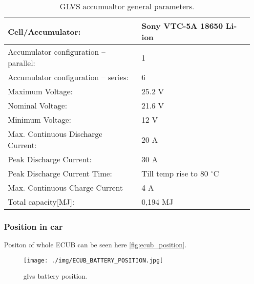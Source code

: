 \begin{table}[H]
	\centering
	\caption{GLVS accumualtor general parameters.}
	\begin{tabu}{|X|X|}\hline
		Cell/Accumulator: & Sony VTC-5A 18650 Li-ion\\\hline
		Accumulator configuration – parallel: & 1 \\\hline
		Accumulator configuration – series: & 6 \\\hline
		Maximum Voltage: & 25.2 V \\\hline
		Nominal Voltage: & 21.6 V \\\hline
		Minimum Voltage: & 12 V \\\hline
		Max. Continuous Discharge Current: & 20 A \\\hline
		Peak Discharge Current: & 30 A \\\hline
		Peak Discharge Current Time: & Till temp rise to 80 $^\circ$C \\\hline
		Max. Continuous Charge Current & 4 A\\\hline
		Total capacity[MJ]: & 0,194 MJ \\\hline
	\end{tabu}%
	\label{tab:LVbatt-general}%
\end{table}%

\subsubsection{Position in car}
Positon of whole ECUB can be seen here \ref{fig:ecub_position}.
\begin{figure}[H]
	\centering
	\texttt{[image: ./img/ECUB\_BATTERY\_POSITION.jpg]}
	\caption{\gls{glvs} battery position.}
	\label{fig:GLVS_battery_position}
\end{figure}